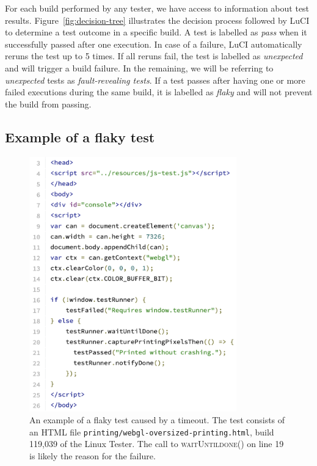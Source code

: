 For each build performed by any tester, we have access to information about test results. Figure~\ref{fig:decision-tree} illustrates the decision process followed by LuCI to determine a test outcome in a specific build. A test is labelled as \textit{pass} when it successfully passed after one execution. In case of a failure, LuCI automatically reruns the test up to 5 times. If all reruns fail, the test is labelled as \textit{unexpected} and will trigger a build failure. In the remaining, we will be referring to \textit{unexpected} tests as \textit{fault-revealing tests}. If a test passes after having one or more failed executions during the same build, it is labelled as \textit{flaky} and will not prevent the build from passing. 


\subsection{Example of a flaky test}


\begin{figure}[ht]
\centering
\includegraphics[width=0.8\textwidth]{figures/chromium/flakyTestExample.png}
\caption{An example of a flaky test caused by a timeout. The test consists of an HTML file \texttt{printing/webgl-oversized-printing.html}, build 119,039 of the Linux Tester. The call to \textsc{waitUntildone()} on line 19 is likely the reason for the failure.}
\label{fig:example}
\end{figure}


